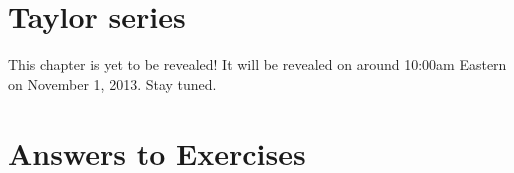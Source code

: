\documentclass[justified]{tufte-book}
\begin{document}
\chapter{Taylor series}
\label{chapter:taylor-series}

This chapter is yet to be revealed!  It will be revealed on
around 10:00am Eastern on November 1, 2013.  Stay tuned.


%

%

%

%
%

\finalizeanswers
\chapter*{Answers to Exercises}
\small
{}
\normalsize
\backmatter

\printindex
\end{document}
